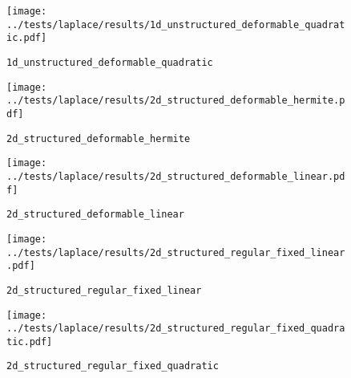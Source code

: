 

%

\begin{figure}[h!]
  \centering%
  \texttt{[image: ../tests/laplace/results/1d\_unstructured\_deformable\_quadratic.pdf]}
  \caption{\lstinline{1d_unstructured_deformable_quadratic}}
\end{figure} 




%

\begin{figure}[h!]
  \centering%
  \texttt{[image: ../tests/laplace/results/2d\_structured\_deformable\_hermite.pdf]}
  \caption{\lstinline{2d_structured_deformable_hermite}}
\end{figure} 




%

\begin{figure}[h!]
  \centering%
  \texttt{[image: ../tests/laplace/results/2d\_structured\_deformable\_linear.pdf]}
  \caption{\lstinline{2d_structured_deformable_linear}}
\end{figure} 




%

\begin{figure}[h!]
  \centering%
  \texttt{[image: ../tests/laplace/results/2d\_structured\_regular\_fixed\_linear.pdf]}
  \caption{\lstinline{2d_structured_regular_fixed_linear}}
\end{figure} 




%

\begin{figure}[h!]
  \centering%
  \texttt{[image: ../tests/laplace/results/2d\_structured\_regular\_fixed\_quadratic.pdf]}
  \caption{\lstinline{2d_structured_regular_fixed_quadratic}}
\end{figure} 


